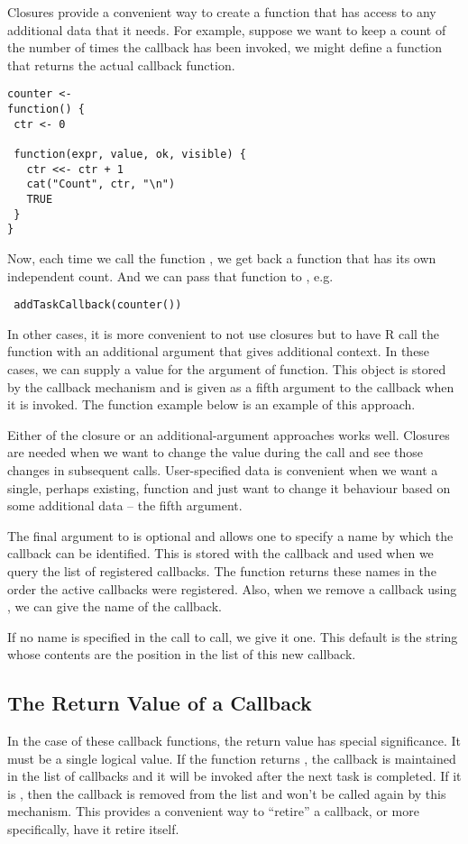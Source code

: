 \documentclass{article}
\begin{document}
Closures provide a convenient way to create a function that has access
to any additional data that it needs.  For example, suppose we want to
keep a count of the number of times the callback has been invoked, we
might define a function that returns the actual callback function.
\begin{verbatim}
counter <-
function() {
 ctr <- 0

 function(expr, value, ok, visible) {
   ctr <<- ctr + 1
   cat("Count", ctr, "\n")
   TRUE
 }
}
\end{verbatim}
Now, each time we call the function ,
we get back a function that has its own independent count.
And we can pass that function to ,
e.g.
\begin{verbatim}
 addTaskCallback(counter())
\end{verbatim}

In other cases, it is more convenient to not use closures but to have
R call the function with an additional argument that gives additional
context.  In these cases, we can supply a value for the 
argument of  function.  This object is
stored by the callback mechanism and is given as a fifth argument to
the callback when it is invoked. The  function
example below is an example of this approach. 

Either of the closure or an additional-argument approaches works well.
Closures are needed when we want to change the value during the call
and see those changes in subsequent calls. User-specified data is
convenient when we want a single, perhaps existing, function and just
want to change it behaviour based on some additional data -- the fifth
argument.

The final argument to  is optional and
allows one to specify a name by which the callback can be identified.
This is stored with the callback and used when we query the list of
registered callbacks.  The function 
returns these names in the order the active callbacks were registered.
Also, when we remove a callback using ,
we can give the name of the callback. 

If no name is specified in the call to 
call, we give it one. This default is the string whose contents are
the position in the list of this new callback.

\subsection{The Return Value of a Callback}
In the case of these callback functions, the return value has special
significance.  It must be a single logical value.  If the function
returns , the callback is maintained in the list of
callbacks and it will be invoked after the next task is completed.  If
it is , then the callback is removed from the list
and won't be called again by this mechanism.  This provides a
convenient way to ``retire'' a callback, or more specifically, have it
retire itself.
\end{document}
